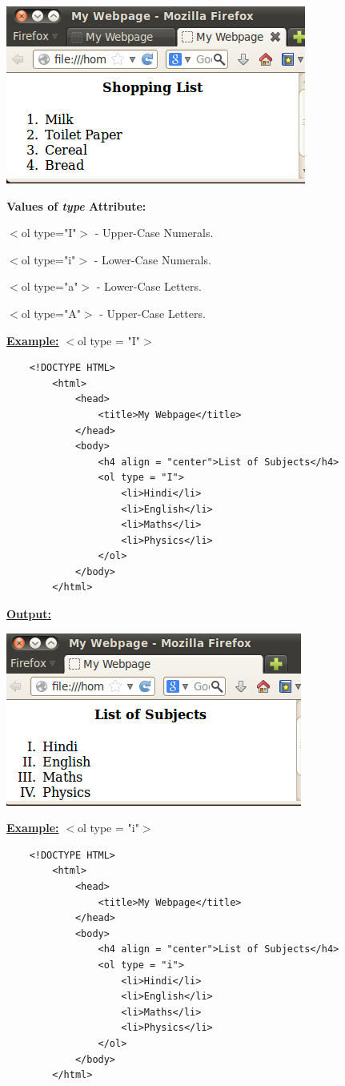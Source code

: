 \documentclass[11pt,a4paper]{article}
\begin{document}
\begin{description}
\includegraphics[scale=0.8]{NumberList.png}\



\textbf{Values of \emph{type} Attribute:}\

$<$ol type="I"$>$ - Upper-Case Numerals.

$<$ol type="i"$>$ - Lower-Case Numerals.

$<$ol type="a"$>$ - Lower-Case Letters.

$<$ol type="A"$>$ - Upper-Case Letters.\

\underline{\textbf{Example:}} $<$ol type = "I"$>$
\begin{verbatim}
    <!DOCTYPE HTML>
        <html>
            <head>
                <title>My Webpage</title>
            </head>
            <body>
                <h4 align = "center">List of Subjects</h4>
                <ol type = "I">
                    <li>Hindi</li>
                    <li>English</li>
                    <li>Maths</li>
                    <li>Physics</li>
                </ol>
            </body>
        </html>
\end{verbatim}

\underline{\textbf{Output:}}\

\includegraphics[scale=0.7]{OL1.png}\

\underline{\textbf{Example:}} $<$ol type = "i"$>$
\begin{verbatim}
    <!DOCTYPE HTML>
        <html>
            <head>
                <title>My Webpage</title>
            </head>
            <body>
                <h4 align = "center">List of Subjects</h4>
                <ol type = "i">
                    <li>Hindi</li>
                    <li>English</li>
                    <li>Maths</li>
                    <li>Physics</li>
                </ol>
            </body>
        </html>
\end{verbatim}


\end{description}
\end{document}
